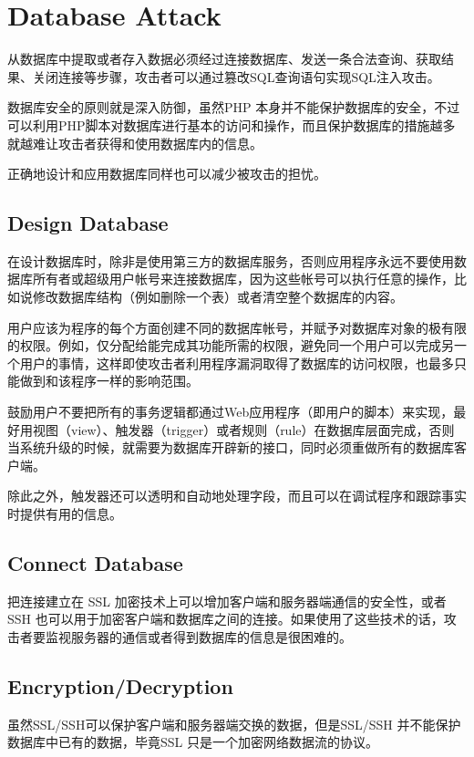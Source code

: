 \section{Database Attack}


从数据库中提取或者存入数据必须经过连接数据库、发送一条合法查询、获取结果、关闭连接等步骤，攻击者可以通过篡改SQL查询语句实现SQL注入攻击。

数据库安全的原则就是深入防御，虽然PHP 本身并不能保护数据库的安全，不过可以利用PHP脚本对数据库进行基本的访问和操作，而且保护数据库的措施越多就越难让攻击者获得和使用数据库内的信息。

正确地设计和应用数据库同样也可以减少被攻击的担忧。

\subsection{Design Database}


在设计数据库时，除非是使用第三方的数据库服务，否则应用程序永远不要使用数据库所有者或超级用户帐号来连接数据库，因为这些帐号可以执行任意的操作，比如说修改数据库结构（例如删除一个表）或者清空整个数据库的内容。

用户应该为程序的每个方面创建不同的数据库帐号，并赋予对数据库对象的极有限的权限。例如，仅分配给能完成其功能所需的权限，避免同一个用户可以完成另一个用户的事情，这样即使攻击者利用程序漏洞取得了数据库的访问权限，也最多只能做到和该程序一样的影响范围。


鼓励用户不要把所有的事务逻辑都通过Web应用程序（即用户的脚本）来实现，最好用视图（view）、触发器（trigger）或者规则（rule）在数据库层面完成，否则当系统升级的时候，就需要为数据库开辟新的接口，同时必须重做所有的数据库客户端。

除此之外，触发器还可以透明和自动地处理字段，而且可以在调试程序和跟踪事实时提供有用的信息。

\subsection{Connect Database}

把连接建立在 SSL 加密技术上可以增加客户端和服务器端通信的安全性，或者 SSH 也可以用于加密客户端和数据库之间的连接。如果使用了这些技术的话，攻击者要监视服务器的通信或者得到数据库的信息是很困难的。

\subsection{Encryption/Decryption}


虽然SSL/SSH可以保护客户端和服务器端交换的数据，但是SSL/SSH 并不能保护数据库中已有的数据，毕竟SSL 只是一个加密网络数据流的协议。

